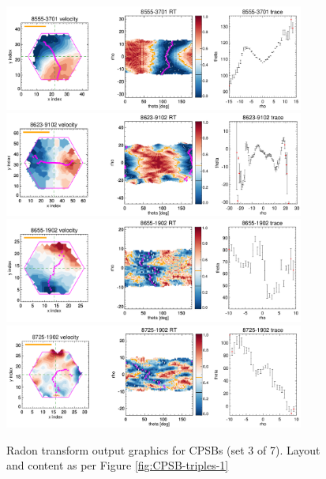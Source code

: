 \documentclass[fleqn,usenatbib]{mnras}
\begin{document}
\begin{figure}
    \centering
    \includegraphics[width=0.88\textwidth]{Images/SN1-MC250/CPSB-triples/CPSB-8555-3701-1-250.png}
    \includegraphics[width=0.88\textwidth]{Images/SN1-MC250/CPSB-triples/CPSB-8623-9102-1-250.png}
    \includegraphics[width=0.88\textwidth]{Images/SN1-MC250/CPSB-triples/CPSB-8655-1902-1-250.png}
    \includegraphics[width=0.88\textwidth]{Images/SN1-MC250/CPSB-triples/CPSB-8725-1902-1-250.png}    
    \caption{Radon transform output graphics for CPSBs (set 3 of 7). Layout and content as per Figure \ref{fig:CPSB-triples-1}}
    \label{fig:CPSB-triples-3}
\end{figure}
\end{document}
